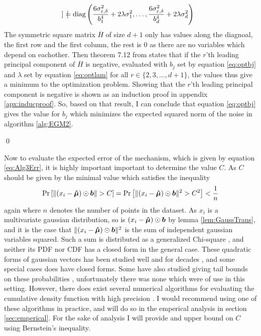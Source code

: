 \documentclass[a4paper,12pt]{article}
\renewenvironment{proof}{{\textit{Proof} \\}}{\qed}
\begin{document}
\begin{proof}
\begin{gather*}
\begin{bmatrix}
\end{bmatrix}
= \text{diag} \left (\frac{6\sigma_{\varepsilon, \delta}^2}{b_1^4} + 2\lambda\sigma_1^2, \dots, \frac{6\sigma_{\varepsilon, \delta}^2}{b_d^4} + 2\lambda\sigma_d^2 \right)
\end{gather*}
The symmetric square matrix $\overline{H}$ of size $d+1$ only has values along the diagnoal, the first row
and the first column, the rest is $0$ as there are no variables which depend on eachother.
Then theorem 7.12 from \cite{matrixcalc} states that if the $r$'th leading principal component of $\overline{H}$ is negative,
evaluated with $b_j$ set by equation \eqref{eq:optbj} and $\lambda$ set by equation \eqref{eq:optlam}
for all $r \in \{2,3,\dots,d+1\}$, the values thus give a minimum to the optimization problem.
Showing that the $r$'th leading principal component is negative is shown as an induction proof in
appendix \ref{apx:inducproof}. So, based on that result, I can conclude that equation \eqref{eq:optbj}
gives the value for $b_j$ which minimizes the expected squared norm of the noise in algorithm \ref{alg:EGM2}.

\end{proof}

Now to evaluate the expected error of the mechanism, which is given by equation \eqref{eq:Alg3Err}, it is highly important important to determine the value $C$.
As $C$ should be given by the minimal value which satisfies the inequality
\[
   \Pr\left [ \| (x_i - \bm{\hat{\mu}}) \odot \bm{b} \| > C  \right] = \Pr\left [ \| (x_i - \bm{\hat{\mu}}) \odot \bm{b} \|^2 > C^2 \right] < \frac{1}{n}
\]
again where $n$ denotes the number of points in the dataset.
As $x_i$ is a multivariate gaussian distribution, so is $(x_i - \bm{\hat{\mu}}) \odot \bm{b}$ by lemma \ref{lem:GaussTrans},
and it is the case that $\|(x_i - \bm{\hat{\mu}}) \odot \bm{b}\|^2$ is the sum of independent gaussian variables squared.
Such a sum is distributed as a generalized Chi-square \cite{GenChiSq}, and neither its PDF nor CDF has a closed form in the general case.
These quadratic forms of gaussian vectors has been studied well and for decades \cite{MathaiQaudForms,IowaQuadNormForms}, and some special cases does have closed forms.
Some have also studied giving tail bounds on these probabilities \cite{QaudFormsBounds}, unfortunately there was none which were of use in this setting.
However, there does exist several numerical algorithms for evaluating the cumulative density function with high precision \cite{QuadFormsNume}. 
I would recommend using one of these algorithms in practice, and will do so in the emperical analysis in section \ref{sec:emperical}.
For the sake of analysis I will provide and upper bound on $C$ using Bernstein's inequality.
\end{document}
